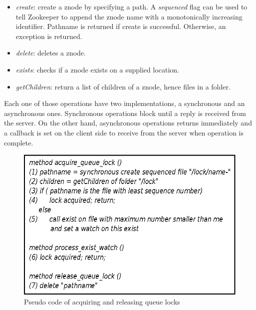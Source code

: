 \begin{itemize}
\item{\emph{create}: create a znode by specifying a path. A \emph{sequenced} flag can be used to tell Zookeeper to append the znode name with a monotonically increasing identifier. Pathname is returned if create is successful. Otherwise, an exception is returned.}
\item{\emph{delete}: deletes a znode.}
\item{\emph{exists}: checks if a znode exists on a supplied location.}
\item{\emph{getChildren}: return a list of children of a znode, hence files in a folder.}
\end{itemize}
Each one of those operations have two implementations, a synchronous and an asynchronous ones. Synchronous operations block until a reply is received from the server. On the other hand, asynchronous operations returns immediately and a callback is set on the client side to receive from the server when operation is complete.

\begin{figure}[h]
\centering
\includegraphics[scale=0.85]{img/queue_lock_pseudo.eps}
\caption{Pseudo code of acquiring and releasing queue locks}
\label{fig:queue_lock_pseudo}
\end{figure}

